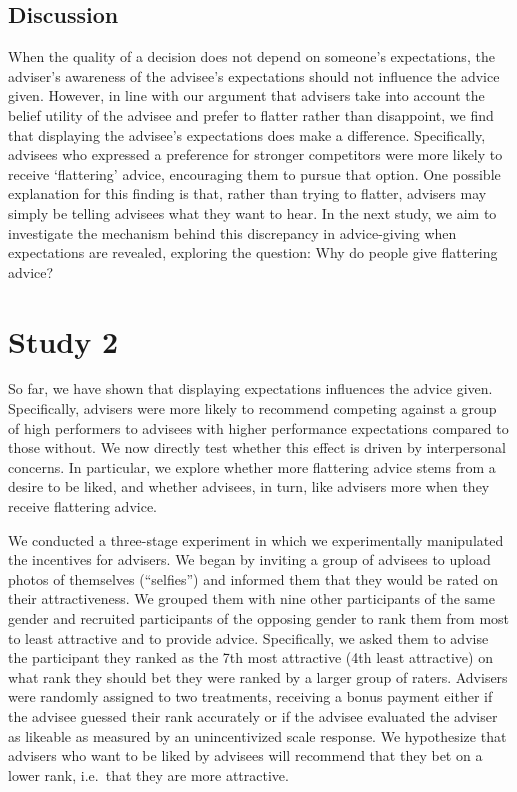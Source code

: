 \documentclass[
  man,
  floatsintext,
  longtable,
  nolmodern,
  notxfonts,
  notimes,
  colorlinks=true,linkcolor=blue,citecolor=blue,urlcolor=blue]{apa7}
\begin{document}
\subsection{Discussion}\label{discussion}

When the quality of a decision does not depend on someone's
expectations, the adviser's awareness of the advisee's expectations
should not influence the advice given. However, in line with our
argument that advisers take into account the belief utility of the
advisee and prefer to flatter rather than disappoint, we find that
displaying the advisee's expectations does make a difference.
Specifically, advisees who expressed a preference for stronger
competitors were more likely to receive `flattering' advice, encouraging
them to pursue that option. One possible explanation for this finding is
that, rather than trying to flatter, advisers may simply be telling
advisees what they want to hear. In the next study, we aim to
investigate the mechanism behind this discrepancy in advice-giving when
expectations are revealed, exploring the question: Why do people give
flattering advice?

\section{Study 2}\label{study-2}

So far, we have shown that displaying expectations influences the advice
given. Specifically, advisers were more likely to recommend competing
against a group of high performers to advisees with higher performance
expectations compared to those without. We now directly test whether
this effect is driven by interpersonal concerns. In particular, we
explore whether more flattering advice stems from a desire to be liked,
and whether advisees, in turn, like advisers more when they receive
flattering advice.

We conducted a three-stage experiment in which we experimentally
manipulated the incentives for advisers. We began by inviting a group of
advisees to upload photos of themselves (``selfies'') and informed them
that they would be rated on their attractiveness. We grouped them with
nine other participants of the same gender and recruited participants of
the opposing gender to rank them from most to least attractive and to
provide advice. Specifically, we asked them to advise the participant
they ranked as the 7th most attractive (4th least attractive) on what
rank they should bet they were ranked by a larger group of raters.
Advisers were randomly assigned to two treatments, receiving a bonus
payment either if the advisee guessed their rank accurately or if the
advisee evaluated the adviser as likeable as measured by an
unincentivized scale response. We hypothesize that advisers who want to
be liked by advisees will recommend that they bet on a lower rank,
i.e.~that they are more attractive.
\end{document}
